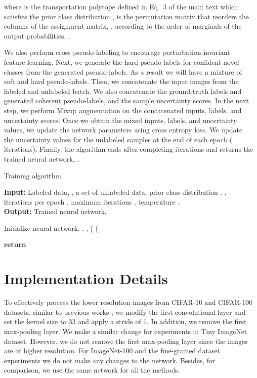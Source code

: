 \documentclass[runningheads]{eccv2022submission}
\begin{document}
where  is the transportation polytope defined in Eq.~3 of the main text which satisfies the prior class distribution ,  is the permutation matrix that reorders the columns of the assignment matrix, , according to the order of marginals of the output probabilities, .


We also perform cross pseudo-labeling to encourage perturbation invariant feature learning. Next, we generate the hard pseudo-labels for confident novel classes from the generated pseudo-labels. As a result we will have a mixture of soft and hard pseudo-labels. Then, we concatenate the input images from the labeled and unlabeled batch. We also concatenate the ground-truth labels and generated coherent pseudo-labels, and the sample uncertainty scores. In the next step, we  perform Mixup augmentation\cite{zhang2018mixup} on the concatenated inputs, labels, and uncertainty scores. Once we obtain the mixed inputs, labels, and uncertainty values, we update the network parameters using cross entropy loss. We update the uncertainty values for the unlabeled samples at the end of each epoch ( iterations). Finally, the algorithm ends after completing  iterations and returns the trained neural network, .       

\begin{algorithm*}[h]
\caption{Training algorithm}
\label{alg: alogirthm1}
\textbf{Input:} Labeled data, , a set of unlabeled data, prior class distribution , , iterations per epoch , maximum iterations , temperature .  \\
\textbf{Output:} Trained neural network, .
\begin{algorithmic}[1]
\State Initialize neural network, .
\State ,  
    \State (
    \State (
  \State   {}
  \State 
  \State 
  \State 
  \State 
  \If{} 
  \State  {}
  \EndIf
 \EndFor

\State \textbf{return} 

\end{algorithmic}
\end{algorithm*}




\section{Implementation Details}
\label{sec:implementation}
To effectively process the lower resolution images from CIFAR-10 and CIFAR-100 datasets, similar to previous works \cite{cao2022openworld,Han2020Automatically,fini2021unified}, we modify the first convolutional layer and set the kernel size to 33 and apply a stride of 1. In addition, we remove the first max-pooling layer. We make a similar change for experiments in Tiny ImageNet dataset. However, we do not remove the first max-pooling layer since the images are of higher resolution. For ImageNet-100 and the fine-grained dataset experiments we do not make any changes to the network. Besides, for comparison, we use the same network for all the methods.       
\end{document}
